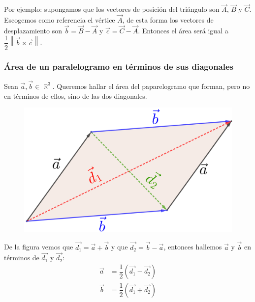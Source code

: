 \documentclass[12pt, fleqn]{report}                             %
\theoremstyle{break}                                            %
\DeclareMathOperator \Reals        {\mathbb{R}}                 %
\newcommand{\Wrap}[1]{\left( #1 \right)}                        %
\newcommand{\Abs}[1]{\left\lVert #1 \right\lVert}               %
\begin{document}
            Por ejemplo: supongamos que los vectores de posición del triángulo son $\vec{A}$, $\vec{B}$ y $\vec{C}$. Escogemos como referencia el vértice $\vec{A}$, de esta forma los vectores de desplazamiento son $\vec{b}=\vec{B}-\vec{A}$ y $\vec{c}=\vec{C}-\vec{A}$. Entonces el área será igual a $\dfrac{1}{2}\Abs{\vec{b} \times \vec{c}}$.
            
            \clearpage
            
            \subsubsection{Área de un paralelogramo en términos de sus diagonales}
            
            Sean $\vec{a}, \vec{b} \in \Reals^3$. Queremos hallar el área del paparelogramo que forman, pero no en términos de ellos, sino de las dos diagonales.
            
            \begin{figure}[H]
                \centering
                \includegraphics[scale=1.3]{parallelogram2.png}
            \end{figure}
            
            De la figura vemos que $\vec{d_1}=\vec{a}+\vec{b}$ y que $\vec{d_2}=\vec{b}-\vec{a}$, entonces hallemos $\vec{a}$ y $\vec{b}$ en términos de $\vec{d_1}$ y $\vec{d_2}$:
            \begin{align*}
                \vec{a} &= \dfrac{1}{2}\Wrap{\vec{d_1}-\vec{d_2}}\\
                \vec{b} &= \dfrac{1}{2}\Wrap{\vec{d_1}+\vec{d_2}}
            \end{align*}
            
\end{document}
